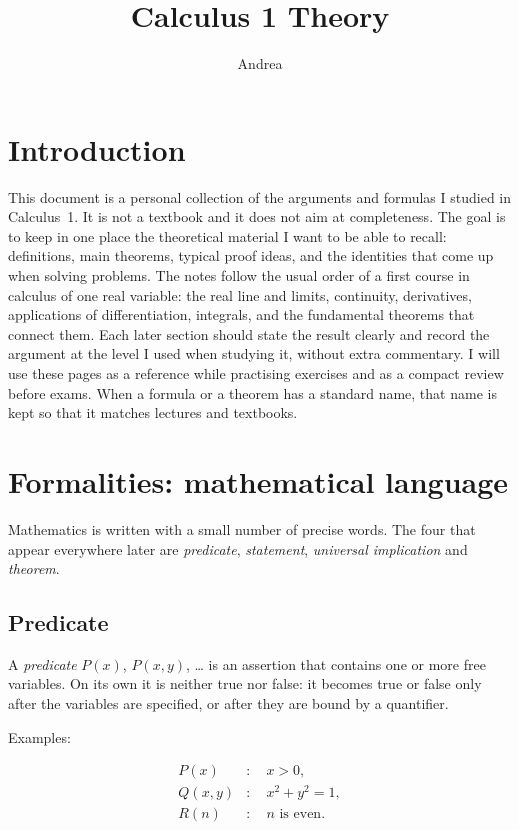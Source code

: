 \documentclass[11pt,a4paper]{article} \usepackage[T1]{fontenc}
\author{Andrea} \date{}
\theoremstyle{plain} \newtheorem{theorem}{Theorem} \title{Calculus 1 Theory}
\begin{document}
\maketitle

\section*{Introduction}

This document is a personal collection of the arguments and formulas I studied
in Calculus~1. It is not a textbook and it does not aim at completeness. The
goal is to keep in one place the theoretical material I want to be able to
recall: definitions, main theorems, typical proof ideas, and the identities
that come up when solving problems. The notes follow the usual order of a first
course in calculus of one real variable: the real line and limits, continuity,
derivatives, applications of differentiation, integrals, and the fundamental
theorems that connect them. Each later section should state the result clearly
and record the argument at the level I used when studying it, without extra
commentary. I will use these pages as a reference while practising exercises
and as a compact review before exams. When a formula or a theorem has a
standard name, that name is kept so that it matches lectures and textbooks.

\section{Formalities: mathematical language}

Mathematics is written with a small number of precise words. The four that
appear everywhere later are \emph{predicate}, \emph{statement}, \emph{universal
implication} and \emph{theorem}.

\subsection{Predicate}

\begin{definition}
[Predicate] A \emph{predicate} $P(x)$, $P(x,y)$, \ldots{} is an assertion that
contains one or more free variables. On its own it is neither true nor false:
it becomes true or false only after the variables are specified, or after they
are bound by a quantifier.
\end{definition}

Examples:

\begin{align*}
P(x) &\colon\quad x>0, \\ Q(x,y) &\colon\quad x^2+y^2=1, \\ R(n) &\colon\quad n\text{ is even}.
\end{align*}
\end{document}
